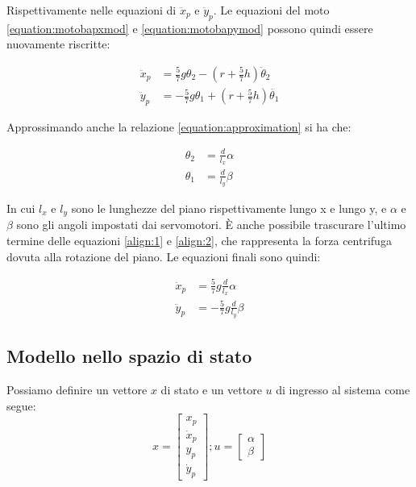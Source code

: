 Rispettivamente nelle equazioni di $\ddot{x}_{p}$ e $\ddot{y}_{p}$. Le equazioni del moto \ref{equation:motobapxmod} e \ref{equation:motobapymod} possono quindi essere nuovamente riscritte:

\begin{align}
	\ddot{x}_{p} &= \frac{5}{7}g\theta_{2}-(r+\frac{5}{7}h)\ddot{\theta}_{2}	\label{align:1}	\\
	\ddot{y}_{p} &= -\frac{5}{7}g\theta_{1}+(r+\frac{5}{7}h)\ddot{\theta_{1}}	\label{align:2}
\end{align}

Approssimando anche la relazione \ref{equation:approximation} si ha che:

\begin{align}
	\theta_{2} &= \frac{d}{l_{x}}\alpha	\\
	\theta_{1} &= \frac{d}{l_{y}}\beta
\end{align}

In cui $l_{x}$ e $l_{y}$ sono le lunghezze del piano rispettivamente lungo x e lungo y, e $\alpha$ e $\beta$ sono gli angoli impostati dai servomotori. È anche possibile trascurare l'ultimo termine delle equazioni \ref{align:1} e \ref{align:2}, che rappresenta la forza centrifuga dovuta alla rotazione del piano. Le equazioni finali sono quindi:

\begin{align}
	\ddot{x}_{p} &= \frac{5}{7}g\frac{d}{l_{x}}\alpha	\label{equation:bapfinalx}	\\
	\ddot{y}_{p} &= -\frac{5}{7}g\frac{d}{l_{y}}\beta	\label{equation:bapfinaly}
\end{align}

\subsection{Modello nello spazio di stato}

Possiamo definire un vettore $x$ di stato e un vettore $u$ di ingresso al sistema come segue:
\begin{equation}
	x=
	\begin{bmatrix}
		x_{p}		\\
		\dot{x}_{p}	\\
		y_{p}		\\
		\dot{y}_{p}
	\end{bmatrix}
	;
	u=
	\begin{bmatrix}
		\alpha	\\
		\beta
	\end{bmatrix}
\end{equation}

